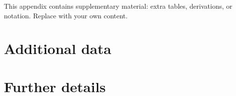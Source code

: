 %

This appendix contains supplementary material: extra tables, derivations, or notation. Replace with your own content.

\section{Additional data}\label{app:data}


\section{Further details}\label{app:details}

